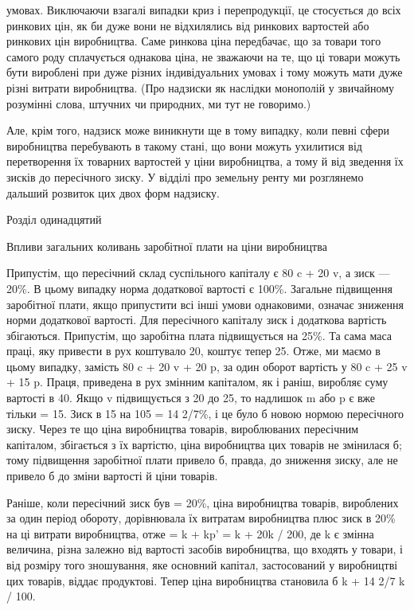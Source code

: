 \parcont{}  %
умовах. Виключаючи взагалі випадки криз і перепродукції, це
стосується до всіх ринкових цін, як би дуже вони не відхилялись
від ринкових вартостей або ринкових цін виробництва.
Саме ринкова ціна передбачає, що за товари того самого роду
сплачується однакова ціна, не зважаючи на те, що ці товари
можуть бути вироблені при дуже різних індивідуальних умовах
і тому можуть мати дуже різні витрати виробництва. (Про надзиски
як наслідки монополій у звичайному розумінні слова, штучних
чи природних, ми тут не говоримо.)

Але, крім того, надзиск може виникнути ще в тому випадку,
коли певні сфери виробництва перебувають в такому стані, що
вони можуть ухилитися від перетворення їх товарних вартостей
у ціни виробництва, а тому й від зведення їх зисків до пересічного
зиску. У відділі про земельну ренту ми розглянемо
дальший розвиток цих двох форм надзиску.

Розділ одинадцятий

Впливи загальних коливань заробітної плати
на ціни виробництва

Припустім, що пересічний склад суспільного капіталу є
80 c + 20 v, а зиск — 20\%. В цьому випадку норма додаткової
вартості є 100\%. Загальне підвищення заробітної плати, якщо
припустити всі інші умови однаковими, означає зниження норми
додаткової вартості. Для пересічного капіталу зиск і додаткова
вартість збігаються. Припустім, що заробітна плата підвищується
на 25\%. Та сама маса праці, яку привести в рух коштувало 20,
коштує тепер 25. Отже, ми маємо в цьому випадку, замість
80 c + 20 v + 20 p, за один оборот вартість у 80 c + 25 v + 15 p.
Праця, приведена в рух змінним капіталом, як і раніш, виробляє
суму вартості в 40. Якщо v підвищується з 20 до 25, то надлишок
m або p є вже тільки = 15. Зиск в 15 на 105 = 14 2/7\%,
і це було б новою нормою пересічного зиску. Через те що
ціна виробництва товарів, вироблюваних пересічним капіталом,
збігається з їх вартістю, ціна виробництва цих товарів не змінилася
б; тому підвищення заробітної плати привело б, правда,
до зниження зиску, але не привело б до зміни вартості й ціни
товарів.

Раніше, коли пересічний зиск був = 20\%, ціна виробництва
товарів, вироблених за один період обороту, дорівнювала їх
витратам виробництва плюс зиск в 20\% на ці витрати виробництва,
отже = k + kp' = k + 20k / 200, де k є змінна величина, різна
залежно від вартості засобів виробництва, що входять у товари,
і від розміру того зношування, яке основний капітал, застосований
у виробництві цих товарів, віддає продуктові. Тепер
ціна виробництва становила б k + 14 2/7 k / 100.
